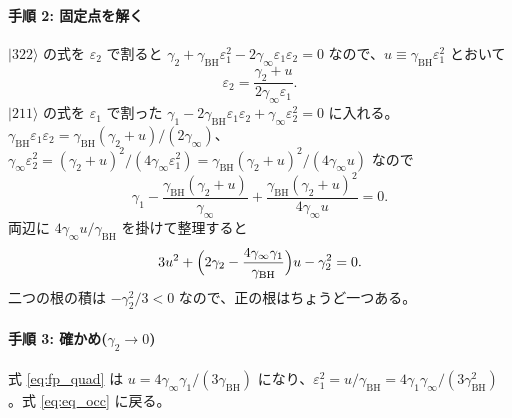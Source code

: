 \paragraph{手順 2: 固定点を解く}
$|322\rangle$ の式を $\varepsilon_2$ で割ると $\gamma_2+\gamma_\mathrm{BH}\varepsilon_1^2-2\gamma_\infty\varepsilon_1\varepsilon_2=0$ なので、$u\equiv\gamma_\mathrm{BH}\varepsilon_1^2$ とおいて
\begin{equation}
\varepsilon_2=\frac{\gamma_2+u}{2\gamma_\infty\varepsilon_1}.
\end{equation}
$|211\rangle$ の式を $\varepsilon_1$ で割った $\gamma_1-2\gamma_\mathrm{BH}\varepsilon_1\varepsilon_2+\gamma_\infty\varepsilon_2^2=0$ に入れる。$\gamma_\mathrm{BH}\varepsilon_1\varepsilon_2=\gamma_\mathrm{BH}(\gamma_2+u)/(2\gamma_\infty)$、$\gamma_\infty\varepsilon_2^2=(\gamma_2+u)^2/(4\gamma_\infty\varepsilon_1^2)=\gamma_\mathrm{BH}(\gamma_2+u)^2/(4\gamma_\infty u)$ なので
\begin{equation}
\gamma_1-\frac{\gamma_\mathrm{BH}(\gamma_2+u)}{\gamma_\infty}+\frac{\gamma_\mathrm{BH}(\gamma_2+u)^2}{4\gamma_\infty u}=0 .
\end{equation}
両辺に $4\gamma_\infty u/\gamma_\mathrm{BH}$ を掛けて整理すると
\begin{equation}
3u^2+\Bigl(2\gamma_2-\frac{4\gamma_\infty\gamma_1}{\gamma_\mathrm{BH}}\Bigr)u-\gamma_2^2=0 .
\label{eq:fp_quad}
\end{equation}
二つの根の積は $-\gamma_2^2/3<0$ なので、正の根はちょうど一つある。

\paragraph{手順 3: 確かめ($\gamma_2\to0$)}
式 \eqref{eq:fp_quad} は $u=4\gamma_\infty\gamma_1/(3\gamma_\mathrm{BH})$ になり、$\varepsilon_1^2=u/\gamma_\mathrm{BH}=4\gamma_1\gamma_\infty/(3\gamma_\mathrm{BH}^2)$。式 \eqref{eq:eq_occ} に戻る。

